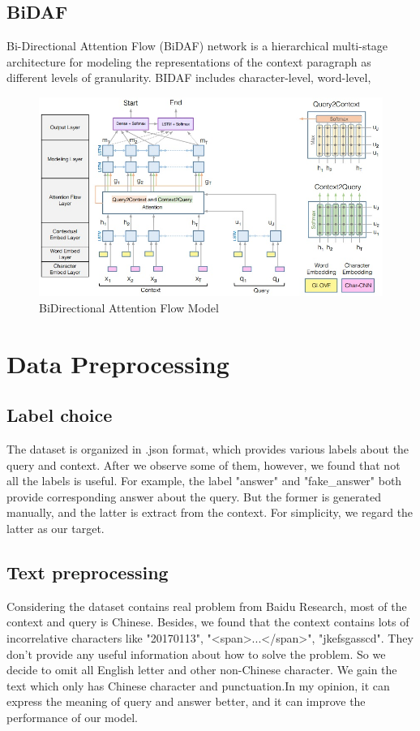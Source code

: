 \documentclass{article}
\begin{document}
\subsection{BiDAF}
Bi-Directional Attention Flow (BiDAF) network is a hierarchical multi-stage architecture for modeling the representations of the context paragraph as different levels of granularity. BIDAF includes character-level, word-level,  \citet{DBLP:journals/corr/SeoKFH16}
\begin{figure}[h]
	\centering
	\includegraphics[scale=0.5]{bidaf.jpg}
	\caption{BiDirectional Attention Flow Model}
\end{figure}

\section{Data Preprocessing}
\subsection{Label choice}
The dataset is organized in .json format, which provides various labels about the query and context. After we observe some of them, however, we found that not all the labels is useful. For example, the label "answer" and "fake\_answer" both provide corresponding answer about the query. But the former is generated manually, and the latter is extract from the context. For simplicity, we regard the latter as our target.
\subsection{Text preprocessing}
Considering the dataset contains real problem from Baidu Research, most of the context and query is Chinese. Besides, we found that the context contains lots of incorrelative characters like "20170113", "<span>...</span>", "jkefsgasscd". They don't provide any useful information about how to solve the problem. So we decide to omit all English letter and other non-Chinese character. We gain the text which only has Chinese character and punctuation.In my opinion, it can express the meaning of query and answer better, and it can improve the performance of our model.
\end{document}
